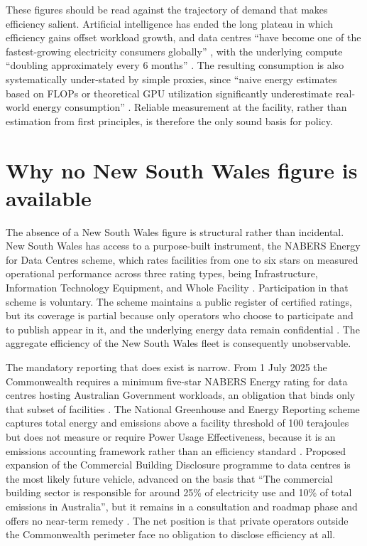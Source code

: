 These figures should be read against the trajectory of demand that makes efficiency salient. Artificial intelligence has ended the long plateau in which efficiency gains offset workload growth, and data centres \enquote{have become one of the fastest-growing electricity consumers globally} \autocite{shengPowerAIData2026}, with the underlying compute \enquote{doubling approximately every 6 months} \autocite{sevillaComputeTrendsThree2022}. The resulting consumption is also systematically under-stated by simple proxies, since \enquote{naive energy estimates based on FLOPs or theoretical GPU utilization significantly underestimate real-world energy consumption} \autocite{fernandezEnergyConsiderationsLarge2025a}. Reliable measurement at the facility, rather than estimation from first principles, is therefore the only sound basis for policy.

\section{Why no New South Wales figure is available}
\label{sec:supp:pue:gap}

The absence of a New South Wales figure is structural rather than incidental. New South Wales has access to a purpose-built instrument, the NABERS Energy for Data Centres scheme, which rates facilities from one to six stars on measured operational performance across three rating types, being Infrastructure, Information Technology Equipment, and Whole Facility \autocite{nabersDataCentres2024}. Participation in that scheme is voluntary. The scheme maintains a public register of certified ratings, but its coverage is partial because only operators who choose to participate and to publish appear in it, and the underlying energy data remain confidential \autocite{nabersEnergyDataCentresRules2024}. The aggregate efficiency of the New South Wales fleet is consequently unobservable.

The mandatory reporting that does exist is narrow. From 1 July 2025 the Commonwealth requires a minimum five-star NABERS Energy rating for data centres hosting Australian Government workloads, an obligation that binds only that subset of facilities \autocite{lsjDataCentresFiveStar2024}. The National Greenhouse and Energy Reporting scheme captures total energy and emissions above a facility threshold of 100 terajoules but does not measure or require Power Usage Effectiveness, because it is an emissions accounting framework rather than an efficiency standard \autocite{dcceewNGERScheme2025}. Proposed expansion of the Commercial Building Disclosure programme to data centres is the most likely future vehicle, advanced on the basis that \enquote{The commercial building sector is responsible for around 25\% of electricity use and 10\% of total emissions in Australia}, but it remains in a consultation and roadmap phase and offers no near-term remedy \autocite{dcceewCBDExpansion2024}. The net position is that private operators outside the Commonwealth perimeter face no obligation to disclose efficiency at all.

